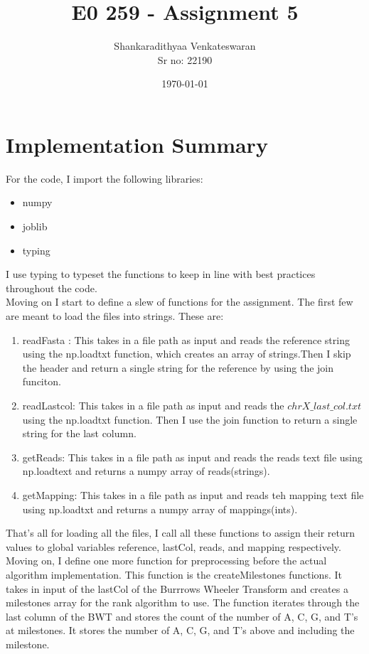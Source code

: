 \documentclass[12pt]{article}
\title{E0 259 - Assignment 5}
\author{Shankaradithyaa Venkateswaran\\ Sr no: 22190}
\date{\today}
\begin{document}
\begin{titlepage}
    \maketitle
\end{titlepage}

\section{Implementation Summary}
For the code, I import the following libraries:\\
\begin{itemize}
    \item numpy
    \item joblib
    \item typing
\end{itemize}
I use typing to typeset the functions to keep in line with best practices throughout the code.\\
Moving on I start to define a slew of functions for the assignment. The first few are meant to load the files into strings. These are:
\begin{enumerate}
    \item readFasta : This takes in a file path as input and reads the reference string using the np.loadtxt function, which creates an array of strings.Then I skip the header and return a single string for the reference by using the join funciton.
    \item readLastcol: This takes in a file path as input and reads the $chrX\_last\_col.txt$ using the np.loadtxt function. Then I use the join function to return a single string for the last column.
    \item getReads: This takes in a file path as input and reads the reads text file using np.loadtext and returns a numpy array of reads(strings).
    \item getMapping: This takes in a file path as input and reads teh mapping text file using np.loadtxt and returns a numpy array of mappings(ints).
\end{enumerate}
That's all for loading all the files, I call all these functions to assign their return values to global variables reference, lastCol, reads, and mapping respectively.\\
Moving on, I define one more function for preprocessing before the actual algorithm implementation. This function is the createMilestones functions. It takes in input of the lastCol of the Burrrows Wheeler Transform and creates a milestones array for the rank algorithm to use. The function iterates through the last column of the BWT and stores the count of the number of A, C, G, and T's at milestones. It stores the number of A, C, G, and T's above and including the milestone.\\
\end{document}
